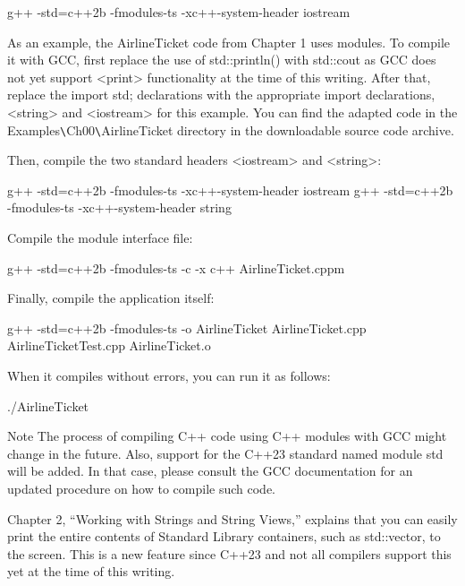 \begin{shell}
g++ -std=c++2b -fmodules-ts -xc++-system-header iostream
\end{shell}

As an example, the AirlineTicket code from Chapter 1 uses modules. To compile it with GCC, first replace the use of std::println() with std::cout as GCC does not yet support <print> functionality at the time of this writing. After that, replace the import std; declarations with the appropriate import declarations, <string> and <iostream> for this example. You can find the adapted code in the Examples\verb|\|Ch00\verb|\|AirlineTicket directory in the downloadable source code archive.

Then, compile the two standard headers <iostream> and <string>:

\begin{shell}
g++ -std=c++2b -fmodules-ts -xc++-system-header iostream
g++ -std=c++2b -fmodules-ts -xc++-system-header string
\end{shell}

Compile the module interface file:

\begin{shell}
g++ -std=c++2b -fmodules-ts -c -x c++ AirlineTicket.cppm
\end{shell}

Finally, compile the application itself:

\begin{shell}
g++ -std=c++2b -fmodules-ts -o AirlineTicket AirlineTicket.cpp AirlineTicketTest.cpp AirlineTicket.o
\end{shell}

When it compiles without errors, you can run it as follows:

\begin{shell}
./AirlineTicket
\end{shell}

\begin{myNotic}{Note}
The process of compiling C++ code using C++ modules with GCC might change in the future. Also, support for the C++23 standard named module std will be added. In that case, please consult the GCC documentation for an updated procedure on how to compile such code.
\end{myNotic}


Chapter 2, “Working with Strings and String Views,” explains that you can easily print the entire contents of Standard Library containers, such as std::vector, to the screen. This is a new feature since C++23 and not all compilers support this yet at the time of this writing.


